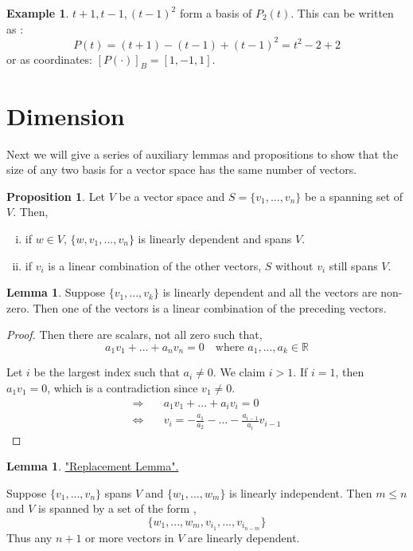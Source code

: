 \documentclass{report}
\theoremstyle{definition}
\newtheorem{_prop}[_thm]{Proposition}
\newtheorem{_lem}[_thm]{Lemma}
\newtheorem{ex}{Example}[section]
\theoremstyle{remark}
\begin{document}
\begin{ex}
${t+1, t-1, (t-1)^2}$ form a basis of $P_2(t)$.
This can be written as :
\[P(t)=(t+1)-(t-1)+(t-1)^2=t^2-2+2\]
or as coordinates: $[P(\cdot)]_B=[1,-1,1]$.
\end{ex}

\section{Dimension}

Next we will give a series of auxiliary lemmas and propositions to show that the size of any two basis for a vector space has the same number of vectors.

\begin{_prop}
Let $V$ be a vector space and $S=\{v_1,...,v_n\}$ be a spanning set of $V$.
Then,
\begin{enumerate}[i)]
 \item if $w\in V$, $\{w,v_1,...,v_n\}$ is linearly dependent and spans $V$.
 \item if $v_i$ is a linear combination of the other vectors, $S$ without $v_i$ still spans $V$.
\end{enumerate}
\end{_prop}

\begin{_lem}
Suppose $\{v_1,...,v_k\}$ is linearly dependent and all the vectors are non-zero.
Then one of the vectors is a linear combination of the preceding vectors.
\end{_lem}
\begin{proof}
Then there are scalars, not all zero such that,
\[a_1v_1+...+a_nv_n=0 \quad \text{where } a_1,...,a_k\in\mathbb{R}\]

Let $i$ be the largest index such that $a_i\neq 0$.
We claim $i>1$.
If $i=1$, then $a_1v_1=0$, which is a contradiction since $v_1 \neq 0$.
\begin{align*}
\Rightarrow \quad & a_1v_1+...+a_iv_i=0 \\
\Leftrightarrow \quad & v_i=-\frac{a_1}{a_2}-...-\frac{a_{i-1}}{a_i}v_{i-1}
\end{align*}
\end{proof}

\begin{_lem} \underline{"Replacement Lemma".}

Suppose $\{v_1,...,v_n\}$ spans $V$ and $\{w_1,...,w_m\}$ is linearly independent.
Then $m\leq n$ and $V$ is spanned by a set of the form ,
\[\{w_1,...,w_m,v_{i_1},...,v_{i_{n-m}}\}\]
Thus any $n+1$ or more vectors in $V$ are linearly dependent.
\end{_lem}
\end{document}
